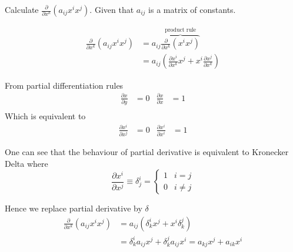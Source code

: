 \documentclass[../main.tex]{subfiles}
\begin{document}
		\begin{example}
			Calculate $\frac{\partial}{\partial x^k}(a_{ij} x^i x^j)$. Given that $a_{ij}$ is a matrix of constants.
		\end{example}
		\begin{solution}
			\begin{align*}
				\frac{\partial}{\partial x^k}(a_{ij} x^i x^j) 	&= a_{ij} \overbrace{\frac{\partial}{\partial x^k}(x^i x^j)}^{\text{product rule}} \\
																&= a_{ij} \left ( \frac{\partial x^i }{\partial x^k} x^j + x^i \frac{\partial x^j }{\partial x^k} \right )
			\end{align*}
			\begin{tcolorbox}[title = Remember]			
				From partial differentiation rules 
				\begin{align*}
					\frac{\partial x}{\partial y} &= 0	&	\frac{\partial x}{\partial x} &= 1	\\
				\end{align*}
				Which is equivalent to 
				\begin{align*}
					\frac{\partial x^i}{\partial x^j} &= 0		&	\frac{\partial x^i}{\partial x^i} &= 1
				\end{align*}
			\end{tcolorbox}
			
			One can see that the behaviour of partial derivative is equivalent to Kronecker Delta where
			\begin{equation*}
				\frac{\partial x^i}{\partial x^j} \equiv \delta_j^i =
				\begin{cases}
					1 & i=j \\
		      		0 & i \neq j
				\end{cases}
			\end{equation*}
			
			Hence we replace partial derivative by $\delta$
			\begin{align*}
				\frac{\partial}{\partial x^k}(a_{ij} x^i x^j) 	&= a_{ij} ( \delta_k^i x^j + x^i \delta_k^j )	 \\
																&= \delta_k^i a_{ij} x^j + \delta_k^j a_{ij} x^i	 =  a_{kj} x^j + a_{ik} x^i											
			\end{align*}
		\end{solution}
		
		
\end{document}
